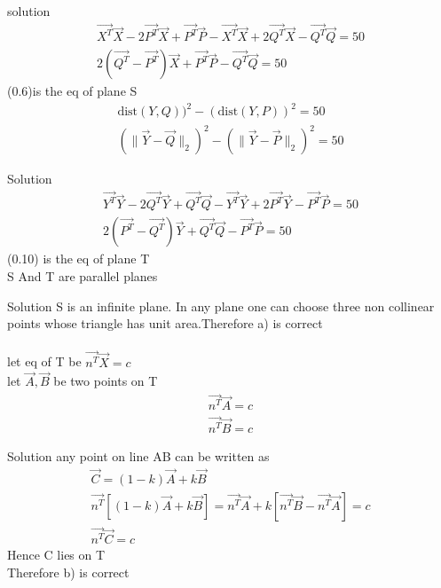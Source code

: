 \documentclass{beamer}
\begin{document}
\begin{frame}{solution}
\begin{align}
\vec{X^T}\vec{X}-2\vec{P^T}\vec{X}+\vec{P^T}\vec{P}-\vec{X^T}\vec{X}
+2\vec{Q^T}\vec{X}-\vec{Q^T}\vec{Q}=50\\
2(\vec{Q^T}-\vec{P^T})\vec{X}+\vec{P^T}\vec{P}-\vec{Q^T}\vec{Q}=50
\end{align}
(0.6)is the eq of plane S
\begin{align}
\text{dist}(Y,Q))^2 - (\text{dist}(Y,P))^2 = 50\\
 (\|\vec{Y}-\vec{Q}\|_2)^2- (\|\vec{Y}-\vec{P}\|_2)^2=50
\end{align}
\end{frame}
\begin{frame}{Solution}
\begin{align}
\vec{Y^T}\vec{Y}-2\vec{Q^T}\vec{Y}+\vec{Q^T}\vec{Q}-\vec{Y^T}\vec{Y}
+2\vec{P^T}\vec{Y}-\vec{P^T}\vec{P}=50\\
2(\vec{P^T}-\vec{Q^T})\vec{Y}+\vec{Q^T}\vec{Q}-\vec{P^T}\vec{P}=50
\end{align}
(0.10) is the eq of plane T\\
S And T are parallel planes\\


\end{frame}
\begin{frame}{Solution}
S is an infinite plane. In any plane one can choose three non collinear points whose triangle has unit area.Therefore a) is correct 
\\
\\
let eq of T be $\vec{n^T}\vec{X}=c$\\
let $\vec{A},\vec{B}$ be two points on T\\
\begin{align}
    \vec{n^T}\vec{A}=c\\
    \vec{n^T}\vec{B}=c
\end{align}
\end{frame}
\begin{frame}{Solution}
any point on line AB can be written as
\begin{align}
    \vec{C}=(1-k)\vec{A}+k\vec{B}\\
    \vec{n^T}[(1-k)\vec{A}+k\vec{B}]
   = \vec{n^T}\vec{A}+k[\vec{n^T}\vec{B}-\vec{n^T}\vec{A}]
   =c\\
   \vec{n^T}\vec{C}=c
\end{align}
Hence C lies on T \\
Therefore b) is correct\\
\end{frame}
\end{document}

